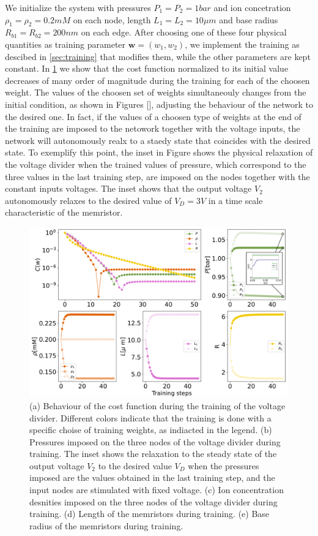 \documentclass[reprint,superscriptaddress,prb,showkeys]{revtex4-2}
\newcommand{\brac}[1]{\left(#1 \right)} %
\begin{document}
We initialize the system with pressures $P_1 =  P_2 = 1 bar$ and ion concetration $\rho_1 = \rho_2 = 0.2 mM$ on each node, length $L_1 = L_2 = 10\mu m$ and base radius  $R_{b1} = R_{b2} = 200 nm$ on each edge. After choosing one of these four physical quantities as training parameter $\boldsymbol{w} = \brac{w_1, w_2}$, we implement the training as descibed in \cref{sec:training} that modifies them, while the other parameters are kept constant. 
In \cref{fig:mse_weights_vd} we show that the cost function normalized to its initial value decreases of many order of magnitude during the training for each of the choosen weight. The values of the choosen set of weights simultaneouly changes from the initial condition, as shown in Figures [], adjusting the behaviour of the network to the desired one. In fact, if the values of a choosen type of weights at the end of the training are imposed to the netowork together with the voltage inputs, the network will autonomously realx to a staedy state that coincides with the desired state. To exemplify this point, the inset in Figure shows the physical relaxation of the voltage divider when the trained values of pressure, which correspond to the three values in the last training step, are imposed on the nodes together with the constant inputs voltages. The inset shows that the output voltage $V_2$ autonomously relaxes to the desired value of $V_D=3V$ in a time scale characteristic of the memristor.

\begin{figure}[h]
    \centering
    \includegraphics[width=\columnwidth]{plots/voltage_divider/mse_weights_vd.pdf}
    \caption{(a) Behaviour of the cost function during the training of the voltage divider. Different colors indicate that the training is done with a specific choise of training weights, as indiacted in the legend. (b) Pressures imposed on the three nodes of the voltage divider during training. The inset shows the relaxation to the steady state of the output voltage $V_2$ to the desired value $V_D$ when the pressures imposed are the values obtained in the last training step, and the input nodes are stimulated with fixed voltage. (c) Ion concentration desnities imposed on the three nodes of the voltage divider during training. (d) Length of the memristors during training. (e) Base radius of the memristors during training.}\label{fig:mse_weights_vd}
\end{figure} 
\end{document}
